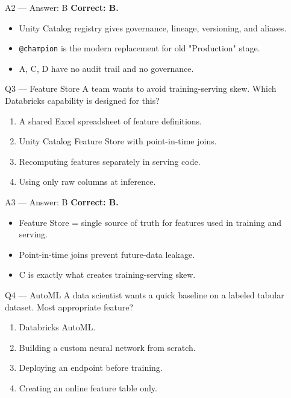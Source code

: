 \documentclass[aspectratio=169,10pt]{beamer}
\begin{document}
	\begin{frame}{A2 — Answer: B}
		\textbf{Correct: B.}
		\begin{itemize}
			\item Unity Catalog registry gives governance, lineage, versioning, and aliases.
			\item \texttt{@champion} is the modern replacement for old "Production" stage.
			\item A, C, D have no audit trail and no governance.
		\end{itemize}
	\end{frame}
	
	\begin{frame}{Q3 — Feature Store}
		A team wants to avoid training-serving skew. Which Databricks capability is designed for this?
		\begin{enumerate}[label=\Alph*.]
			\item A shared Excel spreadsheet of feature definitions.
			\item Unity Catalog Feature Store with point-in-time joins.
			\item Recomputing features separately in serving code.
			\item Using only raw columns at inference.
		\end{enumerate}
	\end{frame}
	
	\begin{frame}{A3 — Answer: B}
		\textbf{Correct: B.}
		\begin{itemize}
			\item Feature Store = single source of truth for features used in training and serving.
			\item Point-in-time joins prevent future-data leakage.
			\item C is exactly what creates training-serving skew.
		\end{itemize}
	\end{frame}
	
	\begin{frame}{Q4 — AutoML}
		A data scientist wants a quick baseline on a labeled tabular dataset. Most appropriate feature?
		\begin{enumerate}[label=\Alph*.]
			\item Databricks AutoML.
			\item Building a custom neural network from scratch.
			\item Deploying an endpoint before training.
			\item Creating an online feature table only.
		\end{enumerate}
	\end{frame}
	
\end{document}
